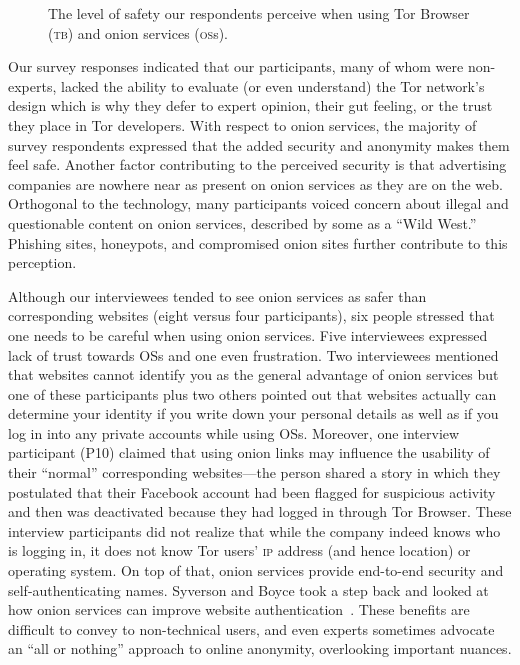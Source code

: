 \begin{figure}[t]
    \centering
    
    \caption{The level of safety our respondents perceive when using Tor
    Browser (\textsc{tb}) and onion services (\textsc{os}s).}
    \label{fig:perceived-security}
\end{figure}

Our survey responses indicated that our participants, many of whom were
non-experts,  lacked the ability to evaluate (or even understand)
the Tor network's design which is why they defer to expert opinion, their gut
feeling, or the trust they place in Tor developers.  With respect to onion
services, the majority of survey respondents expressed that the added security
and anonymity makes them feel safe.  Another factor contributing to the
perceived security is that advertising companies are nowhere near as present on
onion services as they are on the web.  Orthogonal to the technology, many
participants voiced concern about illegal and questionable content on onion
services, described by some as a ``Wild West.''  Phishing sites, honeypots, and
compromised onion sites further contribute to this perception.

Although our interviewees tended to see onion services as safer than
corresponding websites (eight versus four participants), six people stressed
that one needs to be careful when using onion services.  Five interviewees
expressed lack of trust towards OSs and one even frustration.  Two interviewees
mentioned that websites cannot identify you as the general advantage of onion
services but one of these participants plus two others pointed out that websites
actually can determine your identity if you write down your personal details as
well as if you log in into any private accounts while using OSs. Moreover, one
interview participant (P10) claimed that using onion links may influence the
usability of their ``normal'' corresponding websites---the person shared a story
in which they postulated that their Facebook account had been flagged for
suspicious activity and then was deactivated because they had logged in through
Tor Browser.  These interview participants did not realize that while the
company indeed knows who is logging in, it does not know Tor users' \textsc{ip}
address (and hence location) or operating system.  On top of that, onion
services provide end-to-end security and self-authenticating names.  Syverson
and Boyce took a step back and looked at how onion services can improve website
authentication~\cite{Syverson2015a}.  These benefits are difficult to convey to
non-technical users, and even experts sometimes advocate an ``all or nothing''
approach to online anonymity, overlooking important nuances.

